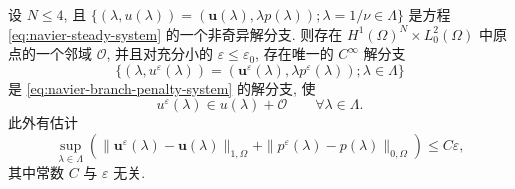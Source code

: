 \setcounter{statement}{3}
\begin{Theorem}\label{thm:navier-branch-penalty-approximation}
设 $N\leq4$, 且
$\{(\lambda,u(\lambda))=(\boldsymbol u(\lambda),\lambda p(\lambda));
\lambda=1/\nu\in\Lambda\}$ 是方程
\eqref{eq:navier-steady-system}
的一个非奇异解分支. 则存在
$H^1(\Omega)^N\times L_0^2(\Omega)$ 中原点的一个邻域 $\mathcal O$, 并且对充分小的
$\varepsilon\leq\varepsilon_0$, 存在唯一的 $C^\infty$ 解分支
\[
\{(\lambda,u^\varepsilon(\lambda))
=(\boldsymbol u^\varepsilon(\lambda),\lambda p^\varepsilon(\lambda));
\lambda\in\Lambda\}
\]
是 \eqref{eq:navier-branch-penalty-system} 的解分支, 使
\[
u^\varepsilon(\lambda)\in u(\lambda)+\mathcal O
\qquad\forall\lambda\in\Lambda.
\]
此外有估计
\begin{equation}\label{eq:navier-branch-penalty-error}
\sup_{\lambda\in\Lambda}
\left(\|\boldsymbol u^\varepsilon(\lambda)-\boldsymbol u(\lambda)\|_{1,\Omega}
+\|p^\varepsilon(\lambda)-p(\lambda)\|_{0,\Omega}\right)
\leq C\varepsilon,
\end{equation}
其中常数 $C$ 与 $\varepsilon$ 无关.
\end{Theorem}

